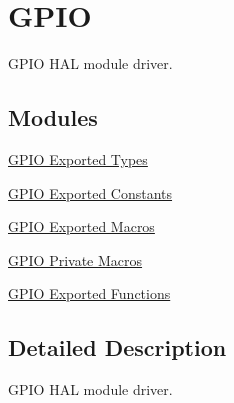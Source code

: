\hypertarget{group___g_p_i_o}{}\section{G\+P\+IO}
\label{group___g_p_i_o}


G\+P\+IO H\+AL module driver.  


\subsection*{Modules}
\begin{DoxyCompactItemize}
\item 
\hyperlink{group___g_p_i_o___exported___types}{G\+P\+I\+O Exported Types}
\item 
\hyperlink{group___g_p_i_o___exported___constants}{G\+P\+I\+O Exported Constants}
\item 
\hyperlink{group___g_p_i_o___exported___macros}{G\+P\+I\+O Exported Macros}
\item 
\hyperlink{group___g_p_i_o___private___macros}{G\+P\+I\+O Private Macros}
\item 
\hyperlink{group___g_p_i_o___exported___functions}{G\+P\+I\+O Exported Functions}
\end{DoxyCompactItemize}


\subsection{Detailed Description}
G\+P\+IO H\+AL module driver. 

